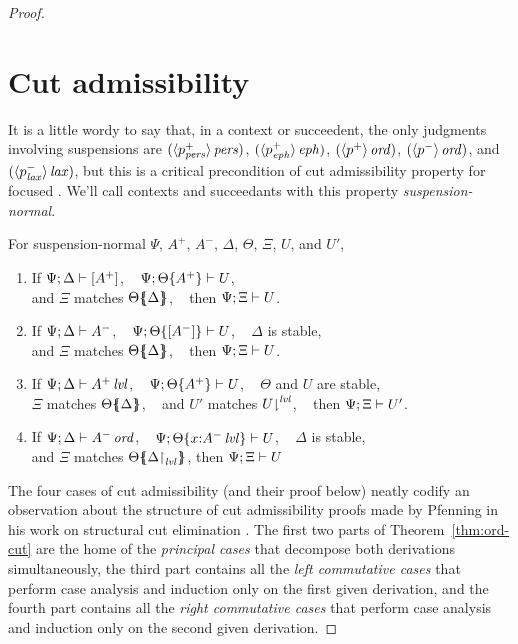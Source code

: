 \begin{proof}
\section{Cut admissibility}
\label{sec:ord-cut}

It is a little wordy to say that, in a context or succeedent, the only
judgments involving suspensions are $({\langle {p^+_{\it pers}} \rangle}\,{{\it pers}})$,
$({\langle {p^+_{\it eph}} \rangle}\,{{\it eph}})$, $({\langle {p^+} \rangle}\,{{\it ord}})$,
$({\langle {p^-} \rangle}\,{{\it ord}})$, and $({\langle {p^-_{\it lax}} \rangle}\,{{\it lax}})$, but this is a
critical precondition of cut admissibility property for focused
\ollll. We'll call contexts and succeedants with this property {\it
  suspension-normal}.

\begin{theorem}\label{thm:ord-cut}
For suspension-normal $\Psi$, $A^+$, $A^-$, $\Delta$, $\Theta$, $\Xi$, $U$, and $U'$,
\begin{enumerate}
\item If ${\Psi};{\Delta} \vdash {[ A^+ ]}$, ~
         ${\Psi};{{\Theta}\{{A^+}\}} \vdash {U}$,\\
      and $\Xi$ matches ${\Theta}\mbox{$\{\hspace{-4pt}\{$}{{\Delta}}\mbox{$\}\hspace{-4pt}\}$}$, ~
      then ${\Psi};{\Xi} \vdash {U}$.
\item If ${\Psi};{\Delta} \vdash {A^-}$, ~
         ${\Psi};{{\Theta}\{{[A^-]}\}} \vdash {U}$, ~
         $\Delta$ is stable, \\
      and $\Xi$ matches ${\Theta}\mbox{$\{\hspace{-4pt}\{$}{\Delta}\mbox{$\}\hspace{-4pt}\}$}$, ~
      then ${\Psi};{\Xi} \vdash {U}$.
\item If ${\Psi};{\Delta} \vdash {{A^+}\,{{\it lvl}}}$, ~
         ${\Psi};{{\Theta}\{{A^+}\}} \vdash {U}$, ~
         $\Theta$ and $U$ are stable, \\ 
      $\Xi$ matches ${\Theta}\mbox{$\{\hspace{-4pt}\{$}{\Delta}\mbox{$\}\hspace{-4pt}\}$}$, ~
      and $U'$ matches ${U}{\downharpoonright}^{{\it lvl}}$, ~
      then ${\Psi};{\Xi} \vdash {U'}$.
\item If ${\Psi};{\Delta} \vdash {{A^-}\,{{\it ord}}}$, ~
         ${\Psi};{{\Theta}\{{x{:}{A^-}\,{{\it lvl}}}\}} \vdash {U}$, ~
         $\Delta$ is stable, \\ 
      and $\Xi$ matches ${\Theta}\mbox{$\{\hspace{-4pt}\{$}{\ensuremath{{\Delta}{\upharpoonright}_{{\it lvl}}}}\mbox{$\}\hspace{-4pt}\}$}$,
      then ${\Psi};{\Xi} \vdash {U}$
\end{enumerate}
\end{theorem}
\medskip

\noindent
The four cases of cut admissibility (and their proof below) neatly
codify an observation about the structure of cut admissibility proofs
made by Pfenning in his work on structural cut elimination
\cite{pfenning00structural}.  The first two parts of
Theorem~\ref{thm:ord-cut} are the home of the {\it principal cases}
that decompose both derivations simultaneously, the third part
contains all the {\it left commutative cases} that perform case
analysis and induction only on the first given derivation, and the
fourth part contains all the {\it right commutative cases} that
perform case analysis and induction only on the second given
derivation.


\end{proof}
